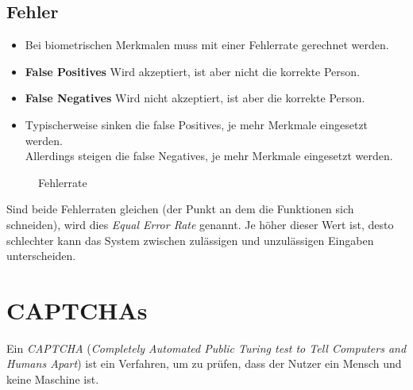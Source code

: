         \subsection{Fehler}
            \begin{itemize}
            	\item Bei biometrischen Merkmalen muss mit einer Fehlerrate gerechnet werden.
            	\item \textbf{False Positives} \tabto{2cm} Wird akzeptiert, ist aber nicht die korrekte Person.
            	\item \textbf{False Negatives} \tabto{2cm} Wird nicht akzeptiert, ist aber die korrekte Person.
            	\item Typischerweise sinken die false Positives, je mehr Merkmale eingesetzt werden. \\ Allerdings steigen die false Negatives, je mehr Merkmale eingesetzt werden.
            \end{itemize}
            \begin{figure}[H]
            	\centering
{}
            	\caption{Fehlerrate}
            \end{figure}
            Sind beide Fehlerraten gleichen (der Punkt an dem die Funktionen sich schneiden), wird dies \textit{Equal Error Rate} genannt. Je höher dieser Wert ist, desto schlechter kann das System zwischen zulässigen und unzulässigen Eingaben unterscheiden.

    \section{CAPTCHAs}
        Ein \textit{CAPTCHA} (\textit{Completely Automated Public Turing test to Tell Computers and Humans Apart}) ist ein Verfahren, um zu prüfen, dass der Nutzer ein Mensch und keine Maschine ist.
        

